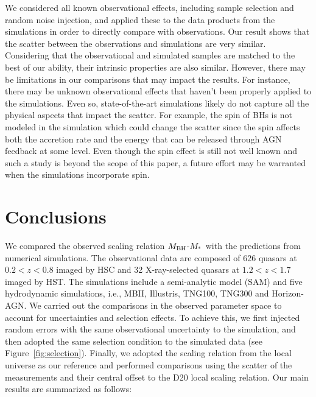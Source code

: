 \documentclass[twocolumn]{aastex631}
\def\smass{{$M_*$}}
\def\mbh{$M_{\rm BH}$}
\begin{document}
We considered all known observational effects, including sample selection and random noise injection, and applied these to the data products from the simulations in order to directly compare with observations. Our result shows that the scatter between the observations and simulations are very similar. Considering that the observational and simulated samples are matched to the best of our ability, their intrinsic properties are also similar. However, there may be limitations in our comparisons that may impact the results. For instance, there may be unknown observational effects that haven't been properly applied to the simulations. Even so, state-of-the-art simulations likely do not capture all the physical aspects that impact the scatter. For example, the spin of BHs is not modeled in the simulation which could change the scatter since the spin affects both the accretion rate and the energy that can be released through AGN feedback \citep{Dubois2014, 2019MNRAS.490.4133B, Habouzit2021} at some level. Even though the spin effect is still not well known and such a study is beyond the scope of this paper, a future effort may be warranted when the simulations incorporate spin.


\section{Conclusions} \label{sec:con}
We compared the observed scaling relation \mbh-\smass\ with the predictions from numerical simulations. The observational data are composed of 626 quasars at $0.2 < z < 0.8$ imaged by HSC and 32 X-ray-selected quasars at $1.2 < z < 1.7$ imaged by HST. The simulations include a semi-analytic model (SAM) and five hydrodynamic simulations, i.e., MBII, Illustris, TNG100, TNG300 and Horizon-AGN. We carried out the comparisons in the observed parameter space to account for uncertainties and selection effects. To achieve this, we first injected random errors with the same observational uncertainty to the simulation, and then adopted the same selection condition to the simulated data (see Figure~\ref{fig:selection}). Finally, we adopted the scaling relation from the local universe as our reference and performed comparisons using the scatter of the measurements and their central offset to the D20 local scaling relation. Our main results are summarized as follows:
\end{document}
